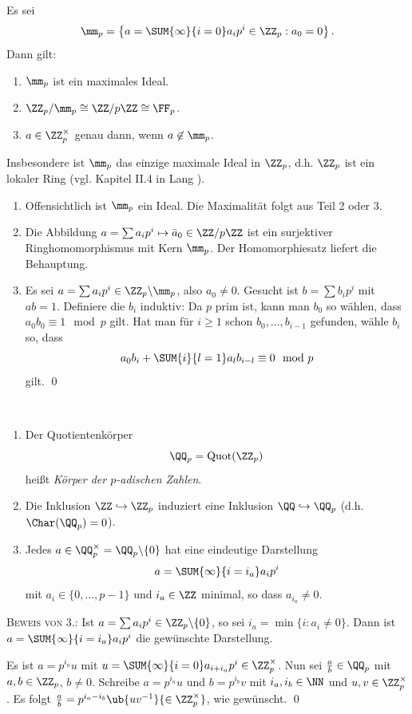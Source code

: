 \BEM Es sei
\[
\mm_p = \left\{
a=\SUM{\infty}{i=0} a_i p^i \in \ZZ_p : a_0=0
\right\}.
\]
Dann gilt:
\begin{enumerate}
\item $\mm_p$ ist ein maximales Ideal.
\item $\ZZ_p/\mm_p \cong \ZZ/p\ZZ \cong \FF_p$.
\item $a\in \ZZ_p^\times$ genau dann, wenn $a\not\in\mm_p$.
\end{enumerate}
Insbesondere ist $\mm_p$ das einzige maximale Ideal in $\ZZ_p$,
d.h. $\ZZ_p$ ist ein lokaler Ring (vgl. Kapitel II.4 in 
Lang \cite{lang}).

\bew \begin{enumerate}
\item Offensichtlich ist $\mm_p$ ein Ideal. Die Maximalität
folgt aus Teil 2 oder 3.
\item Die Abbildung $a=\sum a_i p^i \mapsto \bar{a}_0\in \ZZ/p\ZZ$
ist ein surjektiver Ringhomomorphismus mit Kern $\mm_p$.
Der Homomorphiesatz liefert die Behauptung.
\item Es sei $a=\sum a_i p^i \in \ZZ_p\backslash \mm_p$, also
$a_0\neq 0$. Gesucht ist $b=\sum b_i p^i$ mit $ab=1$.
Definiere die $b_i$ induktiv: Da $p$ prim ist, kann man $b_0$ so 
wählen, dass $a_0 b_0 \equiv 1 \mod p$ gilt.
Hat man für $i\geq 1$ schon $b_0,\ldots,b_{i-1}$ gefunden, wähle
$b_i$ so, dass
\[
a_0 b_i + \SUM{i}{l=1} a_l b_{i-l} \equiv 0 \mod p
\]
gilt.
\qed
\end{enumerate}

\DB\
\begin{enumerate}
\item Der Quotientenkörper
\[
\QQ_p = \mathrm{Quot}(\ZZ_p)
\]
heißt \emph{Körper der $p$-adischen Zahlen}.
\item Die Inklusion $\ZZ\hookrightarrow \ZZ_p$ induziert eine
Inklusion $\QQ\hookrightarrow \QQ_p$ (d.h. $\Char(\QQ_p)=0$).
\item Jedes $a\in \QQ_p^\times=\QQ_p\backslash\{0\}$ hat eine
eindeutige Darstellung
\[
a=\SUM{\infty}{i=i_a} a_i p^i
\]
mit $a_i\in\{0,\ldots,p-1\}$ und $i_a\in\ZZ$ minimal, so dass
$a_{i_a}\neq 0$.
\end{enumerate}
\textsc{Beweis von 3.:} Ist $a=\sum a_i p^i\in\ZZ_p\backslash\{0\}$,
so sei $i_a=\min\{i:a_i\neq 0\}$.
Dann ist $a=\SUM{\infty}{i=i_a} a_i p^i$ die gewünschte Darstellung.

Es ist $a=p^{i_a} u$ mit $u=\SUM{\infty}{i=0}a_{i+i_a} p^i\in\ZZ_p^\times$.
Nun sei $\frac{a}{b}\in\QQ_p$ mit $a,b\in\ZZ_p$, $b\neq 0$.
Schreibe $a=p^{i_a} u$ und $b=p^{i_b}v$ mit $i_a,i_b\in\NN$ und
$u,v\in\ZZ_p^\times$.
Es folgt
$\frac{a}{b}=p^{i_a-i_b} \ub{uv^{-1}}{\in\ZZ_p^\times}$,
wie gewünscht.
\qed

